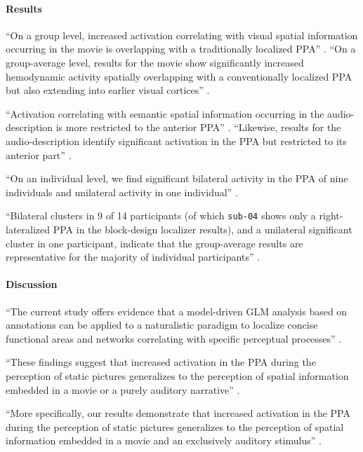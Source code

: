 \paragraph{Results}

``On a group level, increased activation correlating with visual spatial
information occurring in the movie is overlapping with a traditionally localized
PPA'' \citep{haeusler2022processing}.
``On a group-average level, results for the movie show significantly increased
hemodynamic activity spatially overlapping with a conventionally localized PPA
but also extending into earlier visual cortices''
\citep{haeusler2022processing}.

``Activation correlating with semantic spatial information occurring in the
audio-description is more restricted to the anterior PPA''
\citep{haeusler2022processing}.
``Likewise, results for the audio-description identify significant activation in
the PPA but restricted to its anterior part'' \citep{haeusler2022processing}.

``On an individual level, we find significant bilateral activity in the PPA of
nine individuals and unilateral activity in one individual''
\citep{haeusler2022processing}.

``Bilateral clusters in 9 of 14 participants (of which \texttt{sub-04} shows
only a right-lateralized PPA in the block-design localizer results), and a
unilateral significant cluster in one participant, indicate that the
group-average results are representative for the majority of individual
participants'' \citep{haeusler2022processing}.


\paragraph{Discussion}

%
``The current study offers evidence that a model-driven GLM analysis based on
annotations can be applied to a naturalistic paradigm to localize concise
functional areas and networks correlating with specific perceptual processes''
\citep{haeusler2022processing}.

``These findings suggest that increased activation in the PPA during the
perception of static pictures generalizes to the perception of spatial
information embedded in a movie or a purely auditory narrative''
\citep{haeusler2022processing}.

%
``More specifically, our results demonstrate that increased activation in the
PPA during the perception of static pictures generalizes to the perception of
spatial information embedded in a movie and an exclusively auditory stimulus''
\citep{haeusler2022processing}.

